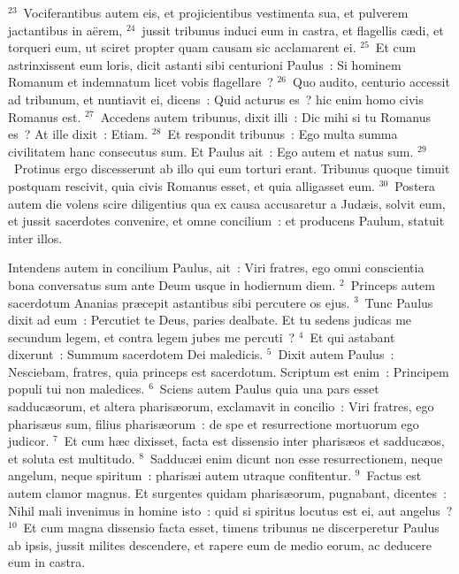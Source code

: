 ${}^{23}$~Vociferantibus autem eis, et projicientibus vestimenta sua, et pulverem jactantibus in a\"erem,
${}^{24}$~jussit tribunus induci eum in castra, et flagellis c\ae di, et torqueri eum, ut sciret propter quam causam sic acclamarent ei.
${}^{25}$~Et cum astrinxissent eum loris, dicit astanti sibi centurioni Paulus~: Si hominem Romanum et indemnatum licet vobis flagellare~?
${}^{26}$~Quo audito, centurio accessit ad tribunum, et nuntiavit ei, dicens~: Quid acturus es~? hic enim homo civis Romanus est.
${}^{27}$~Accedens autem tribunus, dixit illi~: Dic mihi si tu Romanus es~? At ille dixit~: Etiam.
${}^{28}$~Et respondit tribunus~: Ego multa summa civilitatem hanc consecutus sum. Et Paulus ait~: Ego autem et natus sum.
${}^{29}$~Protinus ergo discesserunt ab illo qui eum torturi erant. Tribunus quoque timuit postquam rescivit, quia civis Romanus esset, et quia alligasset eum.
${}^{30}$~Postera autem die volens scire diligentius qua ex causa accusaretur a Jud\ae is, solvit eum, et jussit sacerdotes convenire, et omne concilium~: et producens Paulum, statuit inter illos.

\lettrine[lines=3,image=true,loversize=0.05,lraise=-0.03]{I}{}ntendens autem in concilium Paulus, ait~: Viri fratres, ego omni conscientia bona conversatus sum ante Deum usque in hodiernum diem.
${}^{2}$~Princeps autem sacerdotum Ananias pr\ae cepit astantibus sibi percutere os ejus.
${}^{3}$~Tunc Paulus dixit ad eum~: Percutiet te Deus, paries dealbate. Et tu sedens judicas me secundum legem, et contra legem jubes me percuti~?
${}^{4}$~Et qui astabant dixerunt~: Summum sacerdotem Dei maledicis.
${}^{5}$~Dixit autem Paulus~: Nesciebam, fratres, quia princeps est sacerdotum. Scriptum est enim~: Principem populi tui non maledices.
${}^{6}$~Sciens autem Paulus quia una pars esset sadduc\ae orum, et altera pharis\ae orum, exclamavit in concilio~: Viri fratres, ego pharis\ae us sum, filius pharis\ae orum~: de spe et resurrectione mortuorum ego judicor.
${}^{7}$~Et cum h\ae c dixisset, facta est dissensio inter pharis\ae os et sadduc\ae os, et soluta est multitudo.
${}^{8}$~Sadduc\ae i enim dicunt non esse resurrectionem, neque angelum, neque spiritum~: pharis\ae i autem utraque confitentur.
${}^{9}$~Factus est autem clamor magnus. Et surgentes quidam pharis\ae orum, pugnabant, dicentes~: Nihil mali invenimus in homine isto~: quid si spiritus locutus est ei, aut angelus~?
${}^{10}$~Et cum magna dissensio facta esset, timens tribunus ne discerperetur Paulus ab ipsis, jussit milites descendere, et rapere eum de medio eorum, ac deducere eum in castra.


